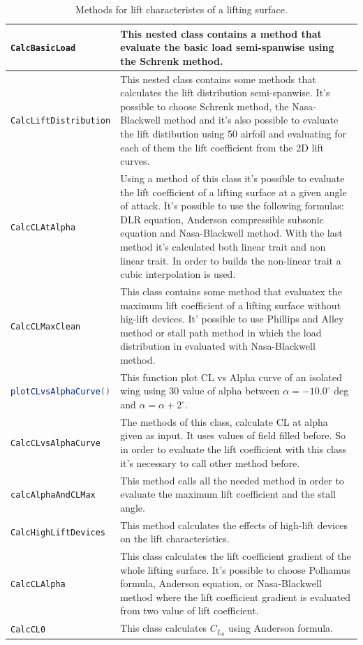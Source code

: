 \begin{table}[H]
\begin{tabular}{p{7cm}p{7.5cm}}
\toprule
\lstinline[language=Java]!CalcBasicLoad! & This nested class contains a method that evaluate the basic load semi-spanwise using the Schrenk method.\\ \hline 
\lstinline[language=Java]!CalcLiftDistribution! &This nested class contains some methods that calculates the lift distribution semi-spanwise. It's possible to choose Schrenk method, the Nasa-Blackwell method and it's also possible to evaluate the lift distibution using 50 airfoil and evaluating for each of them the lift coefficient from the 2D lift curves. \\ \hline 
\lstinline[language=Java]!CalcCLAtAlpha! & Using a method of this class it's possible to evaluate the lift coefficient of a lifting surface at a given angle of attack. It's possible to use the following formulas: DLR equation, Anderson compressible subsonic equation and Nasa-Blackwell method. With the last method it's calculated both linear trait and non linear trait. In order to builds the non-linear trait a cubic interpolation is used.\\ \hline 
\lstinline[language=Java]!CalcCLMaxClean! &This class contains some method that evaluatex the maximum lift coefficient of a lifting surface without hig-lift devices. It' possible to use Phillips and Alley method or stall path method in which the load distribution in evaluated with Nasa-Blackwell method.\\ \hline 
\lstinline[language=Java]!plotCLvsAlphaCurve()! & This function plot CL vs Alpha curve of an isolated wing using 30 value of alpha between $\alpha = - 10.0^{\circ}$  deg and  $\alpha = \alpha + 2^{\circ}$.\\ \hline 
\lstinline[language=Java]!CalcCLvsAlphaCurve!&The methods of this class, calculate CL at alpha given as input. It uses values of field filled before. So in order to evaluate the lift coefficient with this class it's necessary to call other method before.\\ \hline 
\lstinline[language=Java]!calcAlphaAndCLMax! & This method calls all the needed method in order to evaluate the maximum lift coefficient and the stall angle.\\ \hline 
\lstinline[language=Java]!CalcHighLiftDevices! & This method calculates the effects of high-lift devices on the lift characteristics.\\ \hline 
\lstinline[language=Java]!CalcCLAlpha! & This class calculates the lift coefficient gradient of the whole lifting surface. It's possible to choose Polhamus formula,  Anderson equation, or Nasa-Blackwell method where the lift coefficient gradient is evaluated from two value of lift coefficient.\\ \hline 
\lstinline[language=Java]!CalcCL0! & This class calculates $C_{L_0}$ using Anderson formula.\\ \hline 
\bottomrule
\end{tabular}
\caption{Methods for lift characteristcs of a lifting surface.}
\label{table:Table2}
\end{table}


